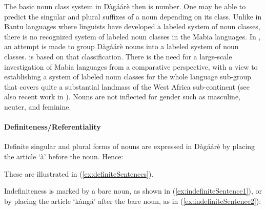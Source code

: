 The basic noun class system in Dàgáárè then is number. One may be able to predict the
singular and plural suffixes of a noun depending on its class. Unlike in Bantu languages
where linguists have developed a labeled system of noun classes, there is no recognized
system of labeled noun classes in the Mabia languages. In \citet{Bodomo1997}, an attempt is made to group Dàgáárè nouns into a labeled system of noun classes.   is
based on that classification. There is the need for a large-scale investigation of Mabia languages from a comparative perspective, with a view to establishing a system of labeled noun classes for the whole language sub-group that covers quite a substantial landmass of the West Africa sub-continent (see also recent work in \citealt{Mieheetal2007}). Nouns are not inflected for gender such as masculine, neuter, and
feminine.

\paragraph{Definiteness/Referentiality}
Definite singular and plural forms of nouns are expressed in Dàgáárè by placing the article ‘à’ before the noun. Hence:

\ea {}
\z \z


These are illustrated in (\ref{ex:definiteSentences}).

\ea\label{ex:definiteSentences} 
\z\z 



Indefiniteness is marked by a bare noun, as shown in (\ref{ex:indefiniteSentence1}), or by placing the article ‘kàngá’
after the bare noun, as in (\ref{ex:indefiniteSentence2}):

